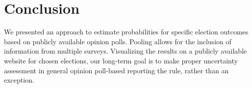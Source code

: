 \documentclass[twoside]{report}
\begin{document}
%
%
%



\section{Conclusion}
We presented an approach to estimate probabilities for specific election outcomes based on publicly available opinion polls. Pooling allows for the inclusion of information from multiple surveys. Visualizing the results on a publicly available website for chosen elections, our long-term goal is to make proper uncertainty assessment
in general opinion poll-based reporting the rule, rather than an exception.
\end{document}
